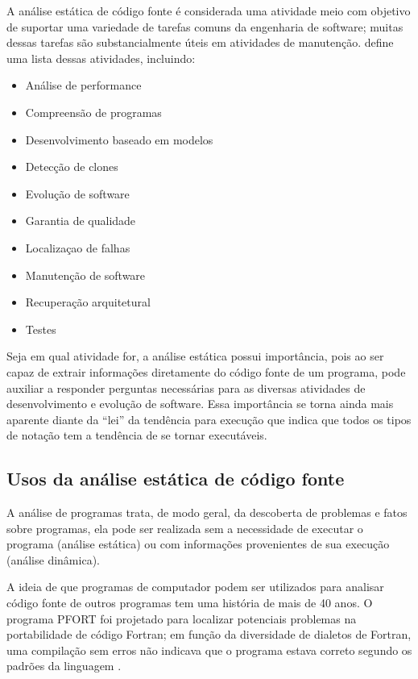A análise estática de código fonte é considerada uma atividade meio com
objetivo de suportar uma variedade de tarefas comuns da engenharia de
software; muitas dessas tarefas são substancialmente úteis em atividades de
manutenção.  define uma lista dessas
atividades, incluindo:

\begin{multicols}{2}
  \begin{itemize}
    \item Análise de performance
    \item Compreensão de programas
    \item Desenvolvimento baseado em modelos
    \item Detecção de clones
    \item Evolução de software
    \item Garantia de qualidade
    \item Localizaçao de falhas
    \item Manutenção de software
    \item Recuperação arquitetural
    \item Testes
  \end{itemize}
\end{multicols}

Seja em qual atividade for, a análise estática possui importância,
pois ao ser capaz de extrair informações diretamente do
código fonte de um programa, pode auxiliar a responder perguntas necessárias
para as diversas atividades de desenvolvimento e evolução de software. Essa
importância se torna ainda mais aparente diante da ``lei'' da tendência para
execução \cite{Harman2010} que indica que todos os tipos de notação tem a
tendência de se tornar executáveis.

\subsection{Usos da análise estática de código fonte} \label{usos}

A análise de programas trata, de modo geral, da descoberta de problemas e
fatos sobre programas, ela pode ser realizada sem a necessidade de executar o
programa (análise estática) ou com informações provenientes de sua execução
(análise dinâmica).

A ideia de que programas de computador podem ser utilizados para analisar
código fonte de outros programas tem uma história de mais de 40 anos.  O
programa PFORT \cite{Ryder1974} foi projetado para localizar potenciais
problemas na portabilidade de código Fortran; em função da diversidade de
dialetos de Fortran, uma compilação sem erros não indicava que o programa
estava correto segundo os padrões da linguagem \cite{Wichmann1995}.

